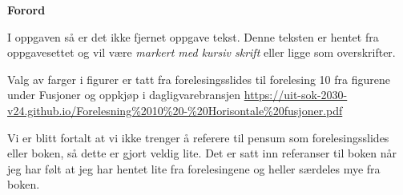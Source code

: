\documentclass[
  12pt,
  a4paper,
  DIV=11,
  numbers=noendperiod]{scrartcl}
\begin{document}







\thispagestyle{plain}
\begin{center}
    \Large
    \textbf{Forord}
\end{center}

I oppgaven så er det ikke fjernet oppgave tekst. Denne teksten er hentet fra oppgavesettet og vil være \textit{markert med kursiv skrift} eller ligge som overskrifter.

Valg av farger i figurer er tatt fra forelesingsslides til forelesing 10 fra figurene under Fusjoner og oppkjøp i dagligvarebransjen  \url{https://uit-sok-2030-v24.github.io/Forelesning%2010%20-%20Horisontale%20fusjoner.pdf}


Vi er blitt fortalt at vi ikke trenger å referere til pensum som forelesingsslides eller boken, så dette er gjort veldig lite. Det er satt inn referanser til boken når jeg har følt at jeg har hentet lite fra forelesingene og heller særdeles mye fra boken. 
\end{document}
